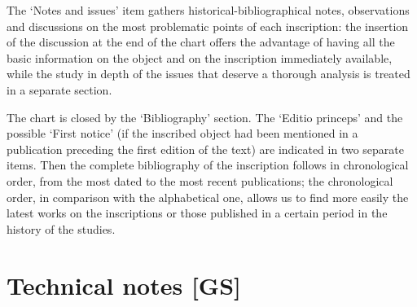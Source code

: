 \documentclass[amsthm,ebook]{saparticle}
\begin{document}
The ‘Notes and issues' item gathers historical-bibliographical notes, observations and discussions on the most
problematic points of each inscription: the insertion of the discussion at the end of the chart offers the advantage of
having all the basic information on the object and on the inscription immediately available, while the study in depth
of the issues that deserve a thorough analysis is treated in a separate section. 

The chart is closed by the ‘Bibliography' section. The ‘Editio princeps' and the possible ‘First notice' (if the
inscribed object had been mentioned in a publication preceding the first edition of the text) are indicated in two
separate items. Then the complete bibliography of the inscription follows in chronological order, from the most dated
to the most recent publications; the chronological order, in comparison with the alphabetical one, allows us to find
more easily the latest works on the inscriptions or those published in a certain period in the history of the studies. 

\section{Technical notes [GS]}
\end{document}
